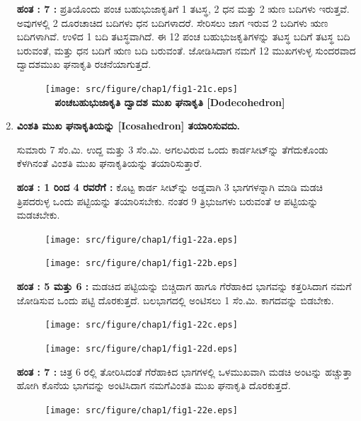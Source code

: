\begin{enumerate}
 \noindent
 {\bf ಹಂತ : 7 :} ಪ್ರತಿಯೊಂದು ಪಂಚ ಬಹುಭುಜಾಕೃತಿಗೆ  1 ತಟಸ್ಥ, 2 ಧನ ಮತ್ತು 2 ಋಣ ಬದಿಗಳು ಇರುತ್ತವೆ. ಅವುಗಳಲ್ಲಿ 2 ದೂರಚಾಚಿದ ಬದಿಗಳು ಧನ ಬದಿ\break ಗಳಾದರೆ. ಸೇರಿಸಲು ಜಾಗ ಇರುವ 2 ಬದಿಗಳು ಋಣ ಬದಿಗಳಾಗಿವೆ. ಉಳಿದ 1 ಬದಿ ತಟಸ್ಥವಾಗಿದೆ. ಈ 12 ಪಂಚ ಬಹುಭುಜಕೃತಿಗಳನ್ನು ತಟಸ್ಥ ಬದಿಗೆ ತಟಸ್ಥ ಬದಿ ಬರುವಂತೆ, ಮತ್ತು ಧನ ಬದಿಗೆ ಋಣ ಬದಿ ಬರುವಂತೆ. ಜೋಡಿಸಿದಾಗ ನಮಗೆ 12 ಮುಖಗಳುಳ್ಳ ಸುಂದರವಾದ ದ್ವಾದಶಮುಖ ಘನಾಕೃತಿ ರಚನೆಯಾಗುತ್ತದೆ. 
 \begin{figure}[H]
\centering
\texttt{[image: src/figure/chap1/fig1-21c.eps]}\\
\textbf{~\hspace{1.5cm} ಪಂಚಬಹುಭುಜಾಕೃತಿ  \qquad  ದ್ವಾದಶ ಮುಖ ಘನಾಕೃತಿ  [Dodecohedron]}
\end{figure}

 \item \textbf{ವಿಂಶತಿ ಮುಖ ಘನಾಕೃತಿಯನ್ನು [Icosahedron] ತಯಾರಿಸುವದು.}
 
 ಸುಮಾರು 7 ಸೆಂ.ಮಿ. ಉದ್ದ ಮತ್ತು 3  ಸೆಂ.ಮಿ. ಅಗಲವಿರುವ ಒಂದು ಕಾರ್ಡ\break ಸೀಟ್‌ನ್ನು ತೆಗೆದುಕೊಂಡು ಕೆಳಗಿನಂತೆ ವಿಂಶತಿ ಮುಖ ಘನಾಕೃತಿಯನ್ನು ತಯಾರಿಸುತ್ತಾರೆ. 
 
 \textbf{ಹಂತ : 1 ರಿಂದ 4 ರವರೆಗೆ  :} ಕೊಟ್ಟ ಕಾರ್ಡ ಸೀಟ್‌ನ್ನು ಅಡ್ಡವಾಗಿ 3 ಭಾಗಗಳ\break ನ್ನಾಗಿ ಮಾಡಿ ಮಡಚಿ ತ್ರಿಪದರುಳ್ಳ ಒಂದು ಪಟ್ಟಿಯನ್ನು ತಯಾರಿಸಬೇಕು. ನಂತರ 9 ತ್ರಿಭುಜಗಳು ಬರುವಂತೆ ಆ ಪಟ್ಟಿಯನ್ನು ಮಡಚಬೇಕು. 
 \begin{figure}[H]
\centering
\texttt{[image: src/figure/chap1/fig1-22a.eps]}
\end{figure}
\begin{figure}[H]
\centering
\texttt{[image: src/figure/chap1/fig1-22b.eps]}
\end{figure}


 \textbf{ಹಂತ : 5 ಮತ್ತು 6 :} ಮಡಚಿದ ಪಟ್ಟಿಯನ್ನು ಬಿಚ್ಚಿದಾಗ ಹಾಗೂ ಗೆರೆಹಾಕಿದ ಭಾಗವನ್ನು ಕತ್ತರಿಸಿದಾಗ ನಮಗೆ ಜೋಡಿಸುವ ಒಂದು ಪಟ್ಟಿ ದೊರಕುತ್ತದೆ. ಬಲಭಾಗದಲ್ಲಿ ಅಂಟಿಸಲು 1 ಸೆಂ.ಮಿ. ಕಾಗದವನ್ನು ಬಿಡಬೇಕು.  
 \begin{figure}[H]
\centering
\texttt{[image: src/figure/chap1/fig1-22c.eps]}
\end{figure}
\begin{figure}[H]
\centering
\texttt{[image: src/figure/chap1/fig1-22d.eps]}
\end{figure}
 
 \textbf{ಹಂತ : 7 : } ಚಿತ್ರ 6 ರಲ್ಲಿ ತೋರಿಸಿದಂತೆ ಗೆರೆಹಾಕಿದ ಭಾಗಗಳಲ್ಲಿ ಒಳಮುಖ\-ವಾಗಿ ಮಡಚಿ ಅಂಟನ್ನು ಹಚ್ಚುತ್ತಾ ಹೋಗಿ ಕೊನೆಯ ಭಾಗವನ್ನು ಅಂಟಿಸಿದಾಗ ನಮಗೆ\break ವಿಂಶತಿ ಮುಖ ಘನಾಕೃತಿ ದೊರಕುತ್ತದೆ.  
 \begin{figure}[H]
\centering
\texttt{[image: src/figure/chap1/fig1-22e.eps]}\\
\end{figure}
 
 \end{enumerate}
 
